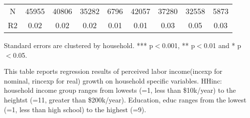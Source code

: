 \documentclass[12pt,notitlepage,onecolumn,aps,pra]{article}
\begin{document}
\begin{table}[ht]
\begin{adjustbox}{width={0.9\textwidth},totalheight={\textheight}}
\begin{threeparttable}
\begin{tabular}{ccccccccc}
N            &     45955 &     40806 &      35282 &        6796 &     42057 &      37280 &       32558 &         5873 \\
R2           &      0.02 &      0.02 &       0.02 &        0.01 &      0.01 &       0.03 &        0.05 &         0.03 \\
\bottomrule
\end{tabular}
\begin{tablenotes}\item Standard errors are clustered by household. *** p$<$0.001, ** p$<$0.01 and * p$<$0.05. 
\item This table reports regression results of perceived labor income(incexp for nominal, rincexp for real) growth on household specific variables. HHinc: household income group ranges from lowests (=1, less than \$10k/year) to the heightst (=11, greater than \$200k/year). Education, educ ranges from the lowest (=1, less than high school) to the highest (=9).
\end{tablenotes}
\end{threeparttable}
\end{adjustbox}
\end{table}
\end{document}
